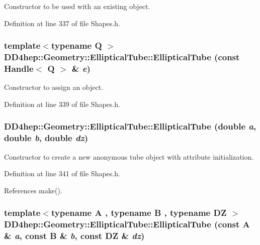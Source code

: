 Constructor to be used with an existing object. 

Definition at line 337 of file Shapes.h.\hypertarget{class_d_d4hep_1_1_geometry_1_1_elliptical_tube_a71d2a63b36daadf5777e12a5998f4c6e}{
\subsubsection[{EllipticalTube}]{\setlength{\rightskip}{0pt plus 5cm}template$<$typename Q $>$ DD4hep::Geometry::EllipticalTube::EllipticalTube (const {\bf Handle}$<$ Q $>$ \& {\em e})}}
\label{class_d_d4hep_1_1_geometry_1_1_elliptical_tube_a71d2a63b36daadf5777e12a5998f4c6e}


Constructor to assign an object. 

Definition at line 339 of file Shapes.h.\hypertarget{class_d_d4hep_1_1_geometry_1_1_elliptical_tube_a4f6811e402eace05bb1640b8d2e50d48}{
\subsubsection[{EllipticalTube}]{\setlength{\rightskip}{0pt plus 5cm}DD4hep::Geometry::EllipticalTube::EllipticalTube (double {\em a}, \/  double {\em b}, \/  double {\em dz})}}
\label{class_d_d4hep_1_1_geometry_1_1_elliptical_tube_a4f6811e402eace05bb1640b8d2e50d48}


Constructor to create a new anonymous tube object with attribute initialization. 

Definition at line 341 of file Shapes.h.

References make().\hypertarget{class_d_d4hep_1_1_geometry_1_1_elliptical_tube_ab65f044778bd07acdd8114ee41052437}{
\subsubsection[{EllipticalTube}]{\setlength{\rightskip}{0pt plus 5cm}template$<$typename A , typename B , typename DZ $>$ DD4hep::Geometry::EllipticalTube::EllipticalTube (const A \& {\em a}, \/  const B \& {\em b}, \/  const DZ \& {\em dz})}}
\label{class_d_d4hep_1_1_geometry_1_1_elliptical_tube_ab65f044778bd07acdd8114ee41052437}


